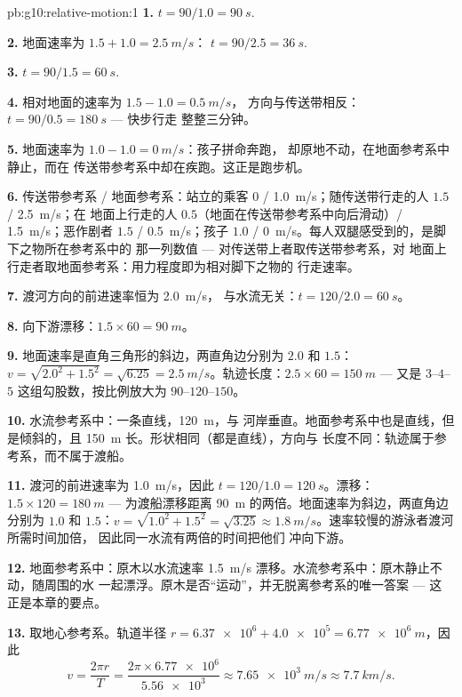 \begin{solution}{pb:g10:relative-motion:1}
\textbf{1.} $t = 90/1.0 = \qty{90}{s}$.

\textbf{2.} 地面速率为 $1.5 + 1.0 = \qty{2.5}{m/s}$：
$t = 90/2.5 = \qty{36}{s}$.

\textbf{3.} $t = 90/1.5 = \qty{60}{s}$.

\textbf{4.} 相对地面的速率为 $1.5 - 1.0 = \qty{0.5}{m/s}$，
方向与传送带相反：$t = 90/0.5 = \qty{180}{s}$ --- 快步行走
整整三分钟。

\textbf{5.} 地面速率为 $1.0 - 1.0 = \qty{0}{m/s}$：孩子拼命奔跑，
却原地不动，在地面参考系中静止，而在
传送带参考系中却在疾跑。这正是跑步机。

\textbf{6.} 传送带参考系 / 地面参考系：站立的乘客 $0$ /
\qty{1.0}{m/s}；随传送带行走的人 $1.5$ / \qty{2.5}{m/s}；在
地面上行走的人 $0.5$（地面在传送带参考系中向后滑动）/
\qty{1.5}{m/s}；恶作剧者 $1.5$ / \qty{0.5}{m/s}；孩子 $1.0$ /
\qty{0}{m/s}。每人双腿感受到的，是脚下之物所在参考系中的
那一列数值 --- 对传送带上者取传送带参考系，对
地面上行走者取地面参考系：用力程度即为相对脚下之物的
行走速率。

\textbf{7.} 渡河方向的前进速率恒为 \qty{2.0}{m/s}，
与水流无关：$t = 120/2.0 = \qty{60}{s}$。

\textbf{8.} 向下游漂移：$1.5 \times 60 = \qty{90}{m}$。

\textbf{9.} 地面速率是直角三角形的斜边，两直角边分别为
$2.0$ 和 $1.5$：$v = \sqrt{2.0^2 + 1.5^2} = \sqrt{6.25}
= \qty{2.5}{m/s}$。轨迹长度：$2.5 \times 60 = \qty{150}{m}$
--- 又是 $3$--$4$--$5$ 这组勾股数，按比例放大为 $90$--$120$--$150$。

\textbf{10.} 水流参考系中：一条直线，\qty{120}{m}，与
河岸垂直。地面参考系中也是直线，但是倾斜的，且
\qty{150}{m} 长。形状相同（都是直线），方向与
长度不同：轨迹属于参考系，而不属于渡船。

\textbf{11.} 渡河的前进速率为 \qty{1.0}{m/s}，因此
$t = 120/1.0 = \qty{120}{s}$。漂移：$1.5 \times 120 = \qty{180}{m}$
--- 为渡船漂移距离 \qty{90}{m} 的两倍。地面速率为斜边，两直角边分别为
$1.0$ 和 $1.5$：$v = \sqrt{1.0^2 + 1.5^2} = \sqrt{3.25}
\approx \qty{1.8}{m/s}$。速率较慢的游泳者渡河所需时间加倍，
因此同一水流有两倍的时间把他们
冲向下游。

\textbf{12.} 地面参考系中：原木以水流速率
\qty{1.5}{m/s} 漂移。水流参考系中：原木静止不动，随周围的水
一起漂浮。原木是否“运动”，并无脱离参考系的唯一答案 --- 这
正是本章的要点。

\textbf{13.} 取地心参考系。轨道半径
$r = \num{6.37e6} + \num{4.0e5} = \qty{6.77e6}{m}$，因此
\[
v = \frac{2\pi r}{T} = \frac{2\pi \times \num{6.77e6}}{\num{5.56e3}}
\approx \qty{7.65e3}{m/s} \approx \qty{7.7}{km/s}.
\]


\end{solution}
